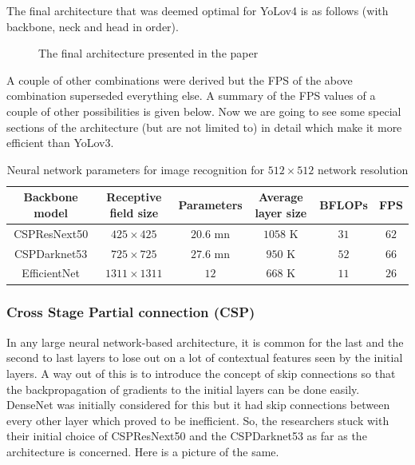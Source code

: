 \newpage

The final architecture that was deemed optimal for YoLov4 is as
follows (with backbone, neck and head in order).

\begin{figure}[h]
  \centering
  \caption{The final architecture presented in the paper}
  \label{fig:final_arch}
\end{figure}

A couple of other combinations were derived but the FPS of the above
combination superseded everything else.  A summary of the FPS values
of a couple of other possibilities is given below. Now we are going
to see some special sections of the architecture (but are not limited
to) in detail which make it more efficient than YoLov3.

\begin{table}[h]
  \def\arraystretch{1.5}
  \centering
  \caption{Neural network parameters for image recognition for $512
  \times 512$ network resolution}
  \begin{tabular}{|c|c|c|c|c|c|}
    \hline
    Backbone model & Receptive field size & Parameters & Average
    layer size & BFLOPs & FPS  \\
    \hline
    CSPResNext50   & $425 \times 425$     & $20.6$ mn  & $1058$ K
    & $31$   & $62$ \\
    \hline
    CSPDarknet53   & $725 \times 725$     & $27.6$ mn  & $950$ K
    & $52$   & $66$ \\
    \hline
    EfficientNet   & $1311 \times 1311$   & $12$       & $668$ K
    & $11$   & $26$ \\
    \hline
  \end{tabular}
  \label{tab:mccons}
\end{table}

\subsubsection{Cross Stage Partial connection (CSP) \cite{Wang_2021_CVPR}}
In any large neural network-based architecture, it is common for the
last and the second to last layers to lose out on a lot of contextual
features seen by the initial layers. A way out of this is to
introduce the concept of skip connections so that the backpropagation
of gradients to the initial layers can be done easily. DenseNet was
initially considered for this but it had skip connections between
every other layer which proved to be inefficient. So, the researchers
stuck with their initial choice of CSPResNext50 and the CSPDarknet53
as far as the architecture is concerned. Here is a picture of the same.

